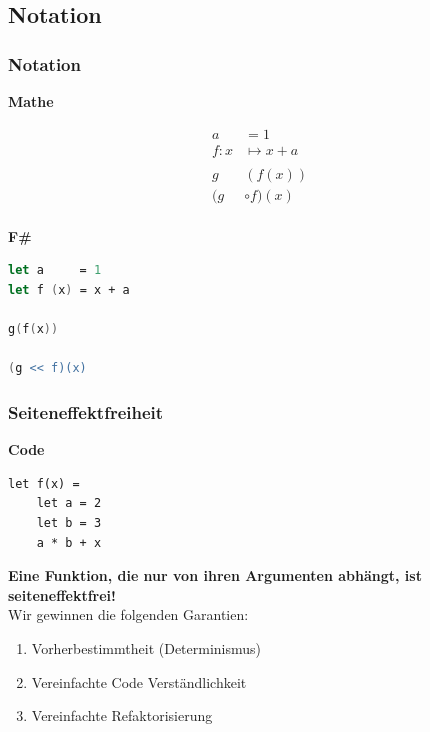 \documentclass{beamer}
\begin{document}
\subsection{Notation}

\begin{frame}[fragile]
    \frametitle{Notation}
    \begin{minipage}[t]{0.5\linewidth}
        \begin{center}
            \textbf{Mathe}
        \end{center}
        \begin{align*}
a &= 1 \\
f: x &\mapsto x + a \\
\\
g&(f(x)) \\
(g& \circ f) (x) \\
        \end{align*}
    \end{minipage}%
    \begin{minipage}[t]{0.5\linewidth}
        \begin{center}
            \textbf{F\#}
        \end{center}
        \begin{lstlisting}[language=FSharp]
let a     = 1
let f (x) = x + a
            
g(f(x))
            
(g << f)(x)            
        \end{lstlisting}
\end{minipage}%
\end{frame}

\begin{frame}[fragile]
    \frametitle{Seiteneffektfreiheit}
    \begin{minipage}[t]{0.4\linewidth}
        \begin{center}
            \textbf{Code}
        \end{center}
\begin{lstlisting}
let f(x) =
    let a = 2
    let b = 3
    a * b + x
\end{lstlisting}
    \end{minipage}%
    \begin{minipage}[t]{0.6\linewidth}
        \textbf{Eine Funktion, die nur von ihren Argumenten abhängt, ist seiteneffektfrei!} \\
        Wir gewinnen die folgenden Garantien:
    \begin{enumerate}
        \item Vorherbestimmtheit (Determinismus)
        \item Vereinfachte Code Verständlichkeit
        \item Vereinfachte Refaktorisierung
    \end{enumerate}
\end{minipage}%
\end{frame}
\end{document}
